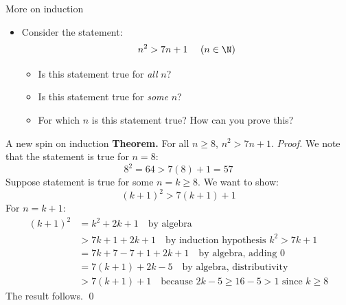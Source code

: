 \documentclass[11pt,aspectratio=1610,handout]{beamer}
\begin{document}
\begin{frame}{More on induction}
	\begin{itemize}
		\item Consider the statement: 
		\[
		n^2 > 7n+1~~~~ (n \in \N)
		\]
		\vspace{-0.2in}
		\begin{itemize}
			\item Is this statement true for \emph{all} $n$? 
			\item Is this statement true for \emph{some} $n$? 
			\item For which $n$ is this statement true? How can you prove this? 
		\end{itemize}\p
		\end{itemize}		
		\vspace{0in}
\hspace{0cm}
\end{frame}

\begin{frame}{A new spin on induction}
	\textbf{Theorem.} For all $n \geq 8$, $n^2 > 7n + 1$. 
	\newline\newline
	\emph{Proof.} We note that the statement is true for $n=8$: 
	\[
	8^2 = 64 > 7(8) + 1 = 57
	\]
	Suppose statement is true for some $n=k \geq 8$. We want to show: 
	\[
	(k+1)^2 > 7(k+1) + 1
	\]
	For $n=k+1$: 
	\begin{align*}
	(k+1)^2 &= k^2 + 2k + 1 \quad \textrm{by algebra}\\
	&> 7k+1+2k+1 \quad \textrm{by induction hypothesis $k^2 > 7k+1$} \\
	&= 7k + 7 - 7 + 1+2k+1 \quad \textrm{by algebra, adding 0} \\
	&= 7(k+1) + 2k - 5 \quad \textrm{by algebra, distributivity} \\
	&> 7(k+1) + 1 \quad \textrm{because $2k-5 \geq 16 - 5 > 1$ since $k \geq 8$}
	\end{align*}
	The result follows. \qed
\end{frame}
\end{document}
